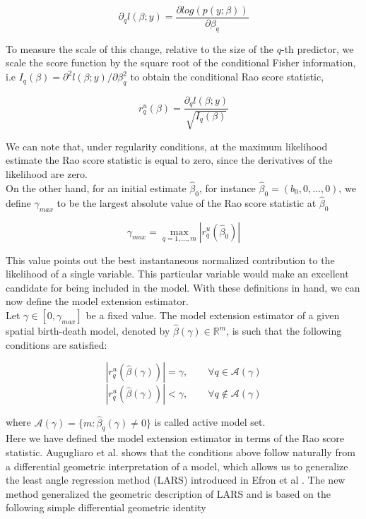 	$$ \partial_q l(\beta;y) = \frac{\partial log(p(y;\beta))}{\partial \beta_q}$$
	
	
To measure the scale of this change, relative to the size of the $q$-th predictor, we scale the score function by the square root of the conditional Fisher information, i.e $I_q(\beta) = \partial^2 l(\beta ; y) / \partial \beta^2_q $ to obtain the conditional Rao score statistic, 

$$ r_q^u (\beta) = \frac{\partial_q l(\beta ; y)}{\sqrt{I_q(\beta)}} $$

We can note that, under regularity conditions, at the maximum likelihood estimate the Rao score statistic is equal to zero, since the derivatives of the likelihood are zero. \\

On the other hand, for an initial estimate $\hat{\beta}_0$, for instance $\hat{\beta}_0 = (b_0,0,...,0)$, we define $\gamma_{max}$ to be the largest absolute value of the Rao score statistic at $\hat{\beta}_0$ 

	$$ \gamma_{max} = \displaystyle\max_{q=1,...,m} |r_q^u(\hat{\beta}_0)|$$

This value points out the best instantaneous normalized contribution to the likelihood of a single variable. This particular variable would make an excellent candidate for being included in the model. With these definitions in hand, we can now define the model extension estimator. \\

Let $\gamma \in [0,\gamma_{max} ]$ be a fixed value. The model extension estimator of a given spatial birth-death model, denoted by $\hat{\beta}(\gamma) \in \mathbb{R}^m$, is such that the following conditions are satisfied: 

	$$ |r_q^u (\hat{\beta}(\gamma))| = \gamma, \qquad \forall q \in \mathcal{A}(\gamma)$$
	$$ |r_q^u (\hat{\beta}(\gamma))| < \gamma, \qquad \forall q \notin \mathcal{A}(\gamma)$$


where $\mathcal{A}(\gamma) = \{ m:\hat{\beta}_q(\gamma) \neq 0 \}$ is called active model set. \\

Here we have defined the model extension estimator in terms of the Rao score statistic. Augugliaro et al. \cite{augugliaro2013differential} shows that the conditions above follow naturally from a differential geometric interpretation of a model, which allows us to generalize the least angle regression method (LARS) introduced in Efron et al \cite{efron2004least}. The new method generalized the geometric description of LARS and is based on the following simple differential geometric identity 

